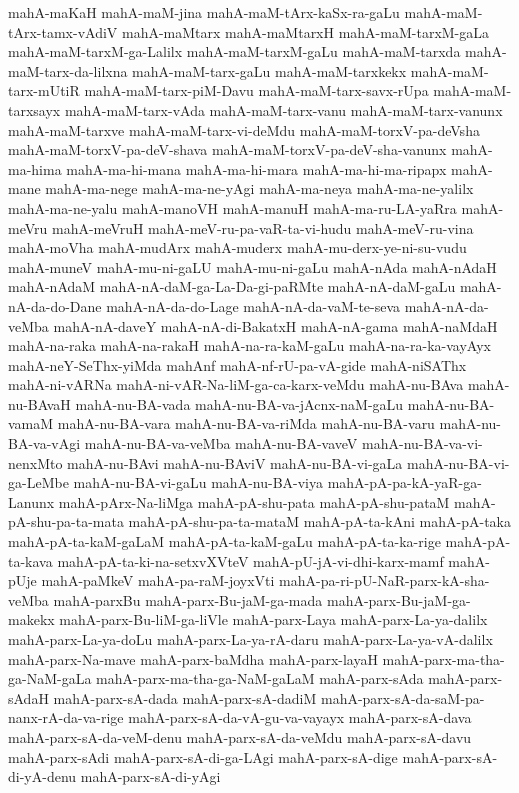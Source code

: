 {mahA-maKaH
mahA-maM-jina
mahA-maM-tArx-kaSx-ra-gaLu
mahA-maM-tArx-tamx-vAdiV
mahA-maMtarx
mahA-maMtarxH
mahA-maM-tarxM-gaLa
mahA-maM-tarxM-ga-Lalilx
mahA-maM-tarxM-gaLu
mahA-maM-tarxda
mahA-maM-tarx-da-lilxna
mahA-maM-tarx-gaLu
mahA-maM-tarxkekx
mahA-maM-tarx-mUtiR
mahA-maM-tarx-piM-Davu
mahA-maM-tarx-savx-rUpa
mahA-maM-tarxsayx
mahA-maM-tarx-vAda
mahA-maM-tarx-vanu
mahA-maM-tarx-vanunx
mahA-maM-tarxve
mahA-maM-tarx-vi-deMdu
mahA-maM-torxV-pa-deVsha
mahA-maM-torxV-pa-deV-shava
mahA-maM-torxV-pa-deV-sha-vanunx
mahA-ma-hima
mahA-ma-hi-mana
mahA-ma-hi-mara
mahA-ma-hi-ma-ripapx
mahA-mane
mahA-ma-nege
mahA-ma-ne-yAgi
mahA-ma-neya
mahA-ma-ne-yalilx
mahA-ma-ne-yalu
mahA-manoVH
mahA-manuH
mahA-ma-ru-LA-yaRra
mahA-meVru
mahA-meVruH
mahA-meV-ru-pa-vaR-ta-vi-hudu
mahA-meV-ru-vina
mahA-moVha
mahA-mudArx
mahA-muderx
mahA-mu-derx-ye-ni-su-vudu
mahA-muneV
mahA-mu-ni-gaLU
mahA-mu-ni-gaLu
mahA-nAda
mahA-nAdaH
mahA-nAdaM
mahA-nA-daM-ga-La-Da-gi-paRMte
mahA-nA-daM-gaLu
mahA-nA-da-do-Dane
mahA-nA-da-do-Lage
mahA-nA-da-vaM-te-seva
mahA-nA-da-veMba
mahA-nA-daveY
mahA-nA-di-BakatxH
mahA-nA-gama
mahA-naMdaH
mahA-na-raka
mahA-na-rakaH
mahA-na-ra-kaM-gaLu
mahA-na-ra-ka-vayAyx
mahA-neY-SeThx-yiMda
mahAnf
mahA-nf-rU-pa-vA-gide
mahA-niSAThx
mahA-ni-vARNa
mahA-ni-vAR-Na-liM-ga-ca-karx-veMdu
mahA-nu-BAva
mahA-nu-BAvaH
mahA-nu-BA-vada
mahA-nu-BA-va-jAcnx-naM-gaLu
mahA-nu-BA-vamaM
mahA-nu-BA-vara
mahA-nu-BA-va-riMda
mahA-nu-BA-varu
mahA-nu-BA-va-vAgi
mahA-nu-BA-va-veMba
mahA-nu-BA-vaveV
mahA-nu-BA-va-vi-nenxMto
mahA-nu-BAvi
mahA-nu-BAviV
mahA-nu-BA-vi-gaLa
mahA-nu-BA-vi-ga-LeMbe
mahA-nu-BA-vi-gaLu
mahA-nu-BA-viya
mahA-pA-pa-kA-yaR-ga-Lanunx
mahA-pArx-Na-liMga
mahA-pA-shu-pata
mahA-pA-shu-pataM
mahA-pA-shu-pa-ta-mata
mahA-pA-shu-pa-ta-mataM
mahA-pA-ta-kAni
mahA-pA-taka
mahA-pA-ta-kaM-gaLaM
mahA-pA-ta-kaM-gaLu
mahA-pA-ta-ka-rige
mahA-pA-ta-kava
mahA-pA-ta-ki-na-setxvXVteV
mahA-pU-jA-vi-dhi-karx-mamf
mahA-pUje
mahA-paMkeV
mahA-pa-raM-joyxVti
mahA-pa-ri-pU-NaR-parx-kA-sha-veMba
mahA-parxBu
mahA-parx-Bu-jaM-ga-mada
mahA-parx-Bu-jaM-ga-makekx
mahA-parx-Bu-liM-ga-liVle
mahA-parx-Laya
mahA-parx-La-ya-dalilx
mahA-parx-La-ya-doLu
mahA-parx-La-ya-rA-daru
mahA-parx-La-ya-vA-dalilx
mahA-parx-Na-mave
mahA-parx-baMdha
mahA-parx-layaH
mahA-parx-ma-tha-ga-NaM-gaLa
mahA-parx-ma-tha-ga-NaM-gaLaM
mahA-parx-sAda
mahA-parx-sAdaH
mahA-parx-sA-dada
mahA-parx-sA-dadiM
mahA-parx-sA-da-saM-pa-nanx-rA-da-va-rige
mahA-parx-sA-da-vA-gu-va-vayayx
mahA-parx-sA-dava
mahA-parx-sA-da-veM-denu
mahA-parx-sA-da-veMdu
mahA-parx-sA-davu
mahA-parx-sAdi
mahA-parx-sA-di-ga-LAgi
mahA-parx-sA-dige
mahA-parx-sA-di-yA-denu
mahA-parx-sA-di-yAgi
}
